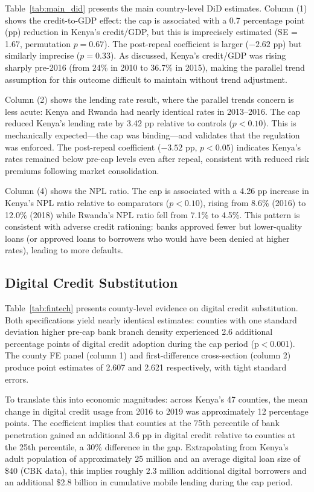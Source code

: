 \documentclass[12pt]{article}
\begin{document}
Table~\ref{tab:main_did} presents the main country-level DiD estimates. Column (1) shows the credit-to-GDP effect: the cap is associated with a 0.7 percentage point (pp) reduction in Kenya's credit/GDP, but this is imprecisely estimated (SE = 1.67, permutation $p = 0.67$). The post-repeal coefficient is larger ($-2.62$ pp) but similarly imprecise ($p = 0.33$). As discussed, Kenya's credit/GDP was rising sharply pre-2016 (from 24\% in 2010 to 36.7\% in 2015), making the parallel trend assumption for this outcome difficult to maintain without trend adjustment.

Column (2) shows the lending rate result, where the parallel trends concern is less acute: Kenya and Rwanda had nearly identical rates in 2013--2016. The cap reduced Kenya's lending rate by 3.42 pp relative to controls ($p < 0.10$). This is mechanically expected---the cap was binding---and validates that the regulation was enforced. The post-repeal coefficient ($-3.52$ pp, $p < 0.05$) indicates Kenya's rates remained below pre-cap levels even after repeal, consistent with reduced risk premiums following market consolidation.

Column (4) shows the NPL ratio. The cap is associated with a 4.26 pp increase in Kenya's NPL ratio relative to comparators ($p < 0.10$), rising from 8.6\% (2016) to 12.0\% (2018) while Rwanda's NPL ratio fell from 7.1\% to 4.5\%. This pattern is consistent with adverse credit rationing: banks approved fewer but lower-quality loans (or approved loans to borrowers who would have been denied at higher rates), leading to more defaults.




\subsection{Digital Credit Substitution}

Table~\ref{tab:fintech} presents county-level evidence on digital credit substitution. Both specifications yield nearly identical estimates: counties with one standard deviation higher pre-cap bank branch density experienced 2.6 additional percentage points of digital credit adoption during the cap period (p$<$0.001). The county FE panel (column 1) and first-difference cross-section (column 2) produce point estimates of 2.607 and 2.621 respectively, with tight standard errors.

To translate this into economic magnitudes: across Kenya's 47 counties, the mean change in digital credit usage from 2016 to 2019 was approximately 12 percentage points. The coefficient implies that counties at the 75th percentile of bank penetration gained an additional 3.6 pp in digital credit relative to counties at the 25th percentile, a 30\% difference in the gap. Extrapolating from Kenya's adult population of approximately 25 million and an average digital loan size of \$40 (CBK data), this implies roughly 2.3 million additional digital borrowers and an additional \$2.8 billion in cumulative mobile lending during the cap period.
\end{document}
